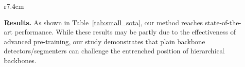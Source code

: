 \documentclass{article} \usepackage{iclr2023_conference,times}
\begin{document}
 
\begin{wraptable}{r}{7.4cm}\small
\renewcommand\arraystretch{0.95}
\vspace{-1.em}
{
\begin{minipage}{0.1\textwidth}
\centering
{
}
\end{minipage}
\hspace{1em}
\begin{minipage}{0.53\textwidth}
\centering
{
}
\end{minipage}
}
\vspace{-1em}
\caption{\textbf{Comparison with previous SOTA.}}
\label{tab:small_sota}
\end{wraptable} \noindent\textbf{Results.}
As shown in Table~\ref{tab:small_sota}, our method reaches state-of-the-art performance.
While these results may be partly due to the effectiveness of advanced pre-training, our study demonstrates that plain backbone detectors/segmenters can challenge the
entrenched position of hierarchical backbones.
\end{document}
